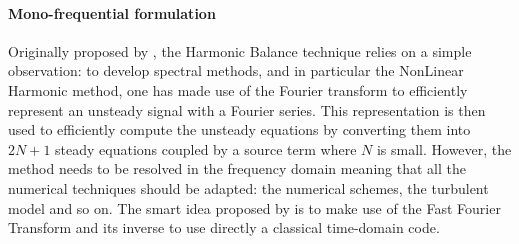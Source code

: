 
\paragraph{Mono-frequential formulation}

Originally proposed by \citet{McMullen2001}, the Harmonic Balance technique
relies on a simple observation: to develop spectral methods, and in
particular the NonLinear Harmonic method, one has made use of the Fourier
transform to efficiently represent an unsteady signal with a Fourier series.
This representation is then used to efficiently compute the unsteady
equations by converting them into $2N+1$ steady equations coupled by a 
source term where $N$ is small.
However, the method needs to be resolved in the frequency domain meaning
that all the numerical techniques should be adapted: the numerical schemes,
the turbulent model and so on. The smart idea 
proposed by \citet{McMullen2001} is to
make use of the Fast Fourier Transform and its inverse to
use directly a classical time-domain code.

